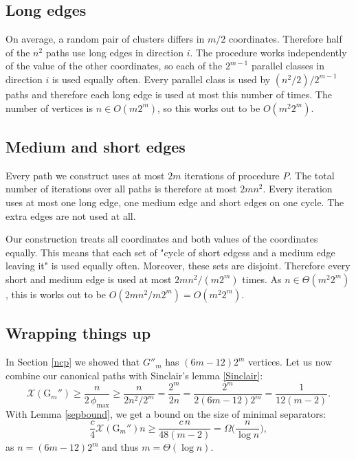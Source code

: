 \documentclass[a4paper,12pt]{book}
\theoremstyle{plain}
\theoremstyle{definition}
\newcommand\CG{\mathrm{G}}
\begin{document}
\subsection{Long edges}

On average, a random pair of clusters differs in $m/2$ coordinates. Therefore half of the $n^2$ paths use long edges in direction $i$.
The procedure works independently of the value of the other coordinates, so each of the $2^{m-1}$ parallel classes in direction $i$ is used
equally often. Every parallel class is used by $(n^2/2) / 2^{m-1}$ paths and therefore each long edge is used at most this number of times. The number of vertices is $n \in O(m2^m)$, so this works out to be $O(m^2 2^m)$.

\subsection{Medium and short edges}

Every path we construct uses at most $2m$ iterations of procedure $P$. The total number of iterations over all paths is therefore at most
$2mn^2$.  Every iteration uses at most one long edge, one medium edge and short edges
on one cycle. The extra edges are not used at all. 

Our construction treats all coordinates and both values of the coordinates equally. This means that 
each set of "cycle of short edgess and a medium edge leaving it"
is used equally often. Moreover, these sets are disjoint. Therefore every short and medium edge is used at most $2mn^2 / (m2^m)$ times. 
As $n \in \Theta(m^2 2^m)$, this is works out to be $O(2mn^2 / m2^m) = O(m^2 2^m)$. 

\subsection{Wrapping things up}

In Section \ref{ncp} we showed that $G''_m$ has $(6m-12)2^m$ vertices. Let us
now combine our canonical paths with Sinclair's lemma \ref{Sinclair}:
\begin{equation}
\mathcal{X}(\CG_m'') 
\ge \frac{n}{2\,\phi_{\max}} 
\ge \frac{n}{2n^2/2^m}
  = \frac{2^m}{2n}
  = \frac{2^m}{2(6m-12)2^m}
  = \frac{1}{12(m-2)}. 
\end{equation}
With Lemma \ref{sepbound}, we get a bound on the size of minimal separators:
\begin{equation}
\frac c4 \mathcal{X}(\CG_m'')n 
\ge \frac{c\,n}{48(m-2)} 
 =  \Omega\Big(\frac n{\log n}\Big),
\end{equation}
as $n = (6m-12)2^m$ and thus $m=\Theta(\log n)$.
\end{document}
